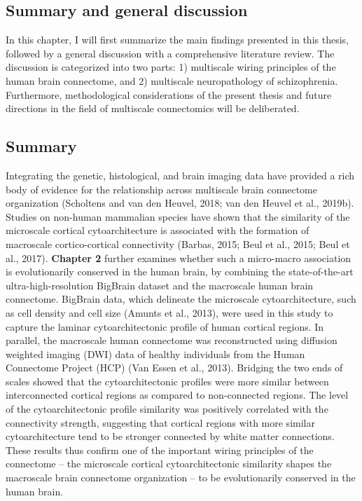 \pagestyle{MyStyle}

\begin{refsection}

\chapter{Summary and general discussion}
\label{ch:summary}

\newpage

In this chapter, I will first summarize the main findings presented in this thesis, followed by a general discussion with a comprehensive literature review. The discussion is categorized into two parts: 1) multiscale wiring principles of the human brain connectome, and 2) multiscale neuropathology of schizophrenia. Furthermore, methodological considerations of the present thesis and future directions in the field of multiscale connectomics will be deliberated.

\section*{Summary}
Integrating the genetic, histological, and brain imaging data have provided a rich body of evidence for the relationship across multiscale brain connectome organization (Scholtens and van den Heuvel, 2018; van den Heuvel et al., 2019b). Studies on non-human mammalian species have shown that the similarity of the microscale cortical cytoarchitecture is associated with the formation of macroscale cortico-cortical connectivity (Barbas, 2015; Beul et al., 2015; Beul et al., 2017). \textbf{Chapter 2} further examines whether such a micro-macro association is evolutionarily conserved in the human brain, by combining the state-of-the-art ultra-high-resolution BigBrain dataset and the macroscale human brain connectome. BigBrain data, which delineate the microscale cytoarchitecture, such as cell density and cell size (Amunts et al., 2013), were used in this study to capture the laminar cytoarchitectonic profile of human cortical regions. In parallel, the macroscale human connectome was reconstructed using diffusion weighted imaging (DWI) data of healthy individuals from the Human Connectome Project (HCP) (Van Essen et al., 2013). Bridging the two ends of scales showed that the cytoarchitectonic profiles were more similar between interconnected cortical regions as compared to non-connected regions. The level of the cytoarchitectonic profile similarity was positively correlated with the connectivity strength, suggesting that cortical regions with more similar cytoarchitecture tend to be stronger connected by white matter connections. These results thus confirm one of the important wiring principles of the connectome – the microscale cortical cytoarchitectonic similarity shapes the macroscale brain connectome organization – to be evolutionarily conserved in the human brain. 


\end{refsection}
